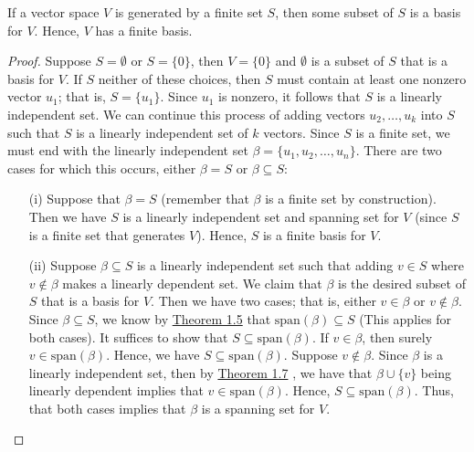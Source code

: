 \begin{theorem}\label{Theorem 1.9}
   If a vector space \( V  \) is generated by a finite set \( S  \), then some subset of \( S  \) is a basis for \( V  \). Hence, \( V  \) has a finite basis. 
\end{theorem}
\begin{proof}
    Suppose \( S = \emptyset \) or \( S = \{ 0 \}  \), then \( V = \{  0  \}  \) and \( \emptyset \) is a subset of \( S  \) that is a basis for \( V  \). If \( S  \) neither of these choices, then \( S  \) must contain at least one nonzero vector \( u_{1}  \); that is, \( S = \{ u_{1} \}  \). Since \( u_{1} \) is nonzero, it follows that \( S  \) is a linearly independent set. We can continue this process of adding vectors \( u_{2}, \dots, u_{k } \) into \( S  \) such that \( S  \) is a linearly independent set of \( k  \) vectors. Since \( S  \) is a finite set, we must end with the linearly independent set \( \beta = \{ u_{1} , u_{2}, \dots, u_{n} \}  \). There are two cases for which this occurs, either \( \beta = S  \) or \( \beta \subseteq S  \): 
    \begin{enumerate}
        \item[(i)] Suppose that \( \beta = S  \) (remember that \( \beta \) is a finite set by construction). Then we have \( S  \) is a linearly independent set and spanning set for \( V  \) (since \( S  \) is a finite set that generates \( V  \)). Hence, \( S  \) is a finite basis for \( V  \).
        \item[(ii)] Suppose  \( \beta \subseteq S  \) is a linearly independent set such that adding \( v \in  S  \) where \( v \notin \beta  \) makes a linearly dependent set. We claim that \( \beta  \) is the desired subset of \( S  \) that is a basis for \( V  \). Then we have two cases; that is, either \( v \in \beta  \) or \( v \notin \beta \). Since  \( \beta \subseteq S   \), we know by { \hyperref[Theorem 1.5]{Theorem 1.5} } that \( \text{span}(\beta) \subseteq S  \) (This applies for both cases). It suffices to show that \( S \subseteq \text{span}(\beta) \). If \( v \in \beta  \), then surely \( v \in \text{span}(\beta) \). Hence, we have \( S \subseteq \text{span}(\beta) \).  Suppose \( v \notin \beta  \). Since \( \beta  \) is a linearly independent set, then by { \hyperref[Theorem  1.7]{Theorem 1.7} }, we have that \( \beta \cup \{ v  \}  \) being linearly dependent implies that \( v \in \text{span}(\beta) \). Hence, \( S \subseteq \text{span}(\beta) \). Thus, that both cases implies that \( \beta \) is a spanning set for \( V  \).    
    \end{enumerate}
\end{proof}

